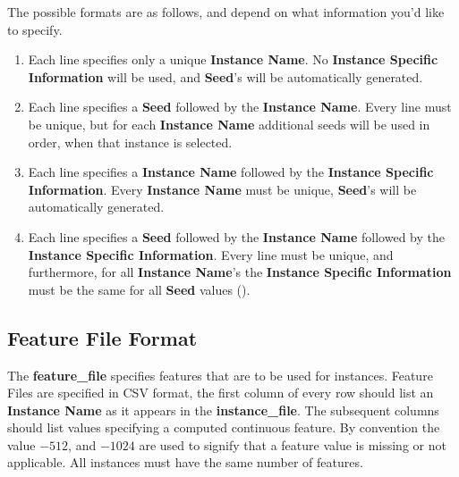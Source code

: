 \documentclass[manual.tex]{subfiles}
\begin{document}
The possible formats are as follows, and depend on what information you'd like to specify.

\begin{enumerate}
\item	Each line specifies only a unique \textbf{Instance Name}. No \textbf{Instance Specific Information} will be used, and \textbf{Seed}'s will be automatically generated.

\item  Each line specifies a \textbf{Seed} followed by the \textbf{Instance Name}. Every line must be unique, but for each \textbf{Instance Name} additional seeds will be used in order, when that instance is selected.

\item Each line specifies a \textbf{Instance Name} followed by the \textbf{Instance Specific Information}. Every \textbf{Instance Name} must be unique, \textbf{Seed}'s will be automatically generated.

\item Each line specifies a \textbf{Seed} followed by the \textbf{Instance Name} followed by the \textbf{Instance Specific Information}. Every line must be unique, and furthermore, for all \textbf{Instance Name}'s the \textbf{Instance Specific Information} must be the same for all \textbf{Seed} values ().

\end{enumerate}

\subsection{Feature File Format}\label{sec:feature_file_format}



The \textbf{feature\_file} specifies features that are to be used for instances. Feature Files are specified in CSV format, the first column of every row should list an \textbf{Instance Name} as it appears in the \textbf{instance\_file}. The subsequent columns should list  values specifying a computed continuous feature. By convention the value $-512$, and $-1024$ are used to signify that a feature value is missing or not applicable. All instances must have the same number of features.
\end{document}
